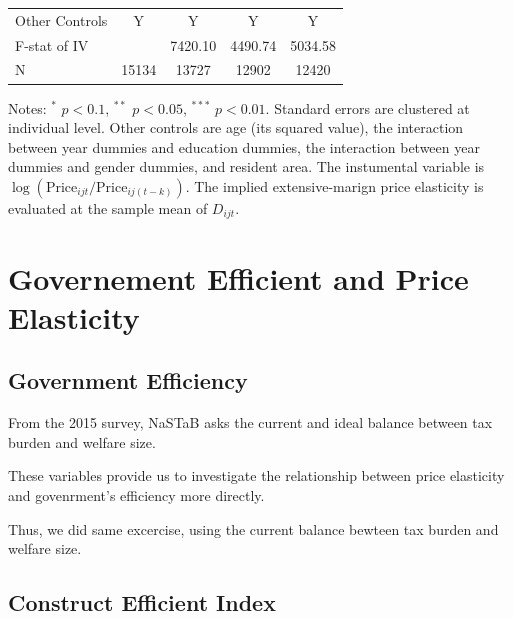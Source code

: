 \documentclass[ review  , 3p ]{elsarticle}
\begin{document}
\begin{table}
\begin{threeparttable}
\begin{tabular}[t]{lcccc}
  \hspace{1em}Other Controls & Y & Y & Y & Y\\
  \hspace{1em}F-stat of IV &  & 7420.10 & 4490.74 & 5034.58\\
  \hspace{1em}N & 15134 & 13727 & 12902 & 12420\\
  \bottomrule
  \end{tabular}
  \begin{tablenotes}
  \item Notes: $^{*}$ $p < 0.1$, $^{**}$ $p < 0.05$, $^{***}$ $p < 0.01$. Standard errors are clustered at individual level. Other controls are age (its squared value), the interaction between year dummies and education dummies, the interaction between year dummies and gender dummies, and resident area. The instumental variable is $\log(\text{Price}_{ijt}/\text{Price}_{ij(t-k)})$. The implied extensive-marign price elasticity is evaluated at the sample mean of $D_{ijt}$.
  \end{tablenotes}
  \end{threeparttable}
  \end{table}
  
  \hypertarget{governement-efficient-and-price-elasticity}{%
  \section{Governement Efficient and Price Elasticity}\label{governement-efficient-and-price-elasticity}}
  
  \hypertarget{government-efficiency}{%
  \subsection{Government Efficiency}\label{government-efficiency}}
  
  From the 2015 survey,
  NaSTaB asks the current and ideal balance between tax burden and welfare size.
  
  These variables provide us to investigate the relationship between price elasticity and govenrment's efficiency
  more directly.
  
  Thus, we did same excercise, using the current balance bewteen tax burden and welfare size.
  
  \hypertarget{construct-efficient-index}{%
  \subsection{Construct Efficient Index}\label{construct-efficient-index}}
  
\end{document}

